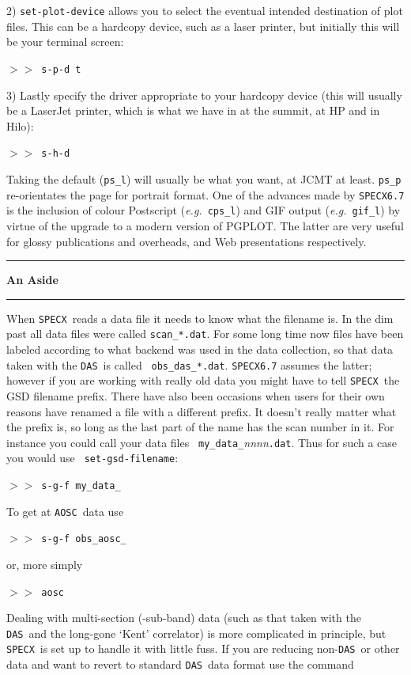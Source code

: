 \documentclass[11pt,twoside]{article}
\newcommand{\eg}{{\it e.g.}}
\newcommand{\SPECX}{{\tt SPECX}}
\newcommand{\das}{{\tt DAS}}
\newcommand{\aosc}{{\tt AOSC}}
\newcommand{\SP}{{$>\!>$}}
\newcommand{\aside}
{\begin{center}\rule[1mm]{1.0in}{0.015in}\hspace*{2mm}
{\bf An Aside}
\hspace*{2mm}\rule[1mm]{1.0in}{0.015in}\end{center}\vspace*{-0.2in}}
\begin{document}
2) {\tt set-plot-device} allows you to select the eventual intended
destination of plot files.  This can be a hardcopy device, such as a
laser printer, but initially this will be your terminal screen:

\SP\  {\tt s-p-d  t} 

3) Lastly specify the driver appropriate to your hardcopy device (this
will usually be a LaserJet printer, which is what we have in at the
summit, at HP and in Hilo):

\SP\  {\tt s-h-d} 

Taking the default ({\tt{ps\_l}}) will usually be what you want, at JCMT at
least. {\tt ps\_p} re-orientates the page for portrait format.  One of the
advances made by \SPECX {\tt 6.7} is the inclusion of colour Postscript
(\eg\ {\tt cps\_l}) and GIF output (\eg\ {\tt gif\_l}) by virtue of the
upgrade to a modern version of PGPLOT. The latter are very useful for
glossy publications and overheads, and Web presentations respectively. 

\aside

When \SPECX\ reads a data file it needs to know what the filename is.  In
the dim past all data files were called {\tt scan\_*.dat}.  For some long
time now files have been labeled according to what backend was used in the
data collection, so that data taken with the \das\ is called {\tt
obs\_das\_*.dat}. \SPECX {\tt 6.7} assumes the latter; however if you are
working with really old data you might have to tell \SPECX\ the GSD
filename prefix. There have also been occasions when users for their own
reasons have renamed a file with a different prefix. It doesn't really
matter what the prefix is, so long as the last part of the name has the
scan number in it. For instance you could call your data files {\tt
my\_data\_}{\it nnnn}{\tt .dat}. Thus for such a case you would use {\tt
set-gsd-filename}: 

\SP\ {\tt s-g-f my\_data\_}

To get at \aosc\ data use

\SP\ {\tt s-g-f obs\_aosc\_}

or, more simply

\SP\ {\tt aosc}

Dealing with multi-section (-sub-band) data (such as that taken with the
\das\ and the long-gone `Kent' correlator) is more complicated in
principle, but \SPECX\ is set up to handle it with little fuss. If you are
reducing non-\das\ or other data and want to revert to standard \das\ data
format use the command
\end{document}
